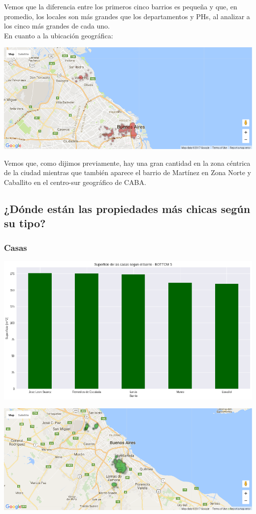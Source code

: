 \documentclass[a4paper, 10pt]{article}
\newcommand\tab[1][0.5cm]{\hspace*{#1}}
\begin{document}
				  	\tab Vemos que la diferencia entre los primeros cinco barrios es pequeña y que, en promedio, los locales son
				  	más grandes que los departamentos y PHs, al analizar a los cinco más grandes de cada uno. \\
				  	\tab En cuanto a la ubicación geográfica:
				  	\begin{center}
   		    				\includegraphics[width=\textwidth]{images/storeSurfaceTopMap}
				  	\end{center}
				  	\tab Vemos que, como dijimos previamente, hay una gran cantidad en la zona céntrica de la ciudad mientras que
				  	también aparece el barrio de Martínez en Zona Norte y Caballito en el centro-sur geográfico de CABA.
			\subsection{¿Dónde están las propiedades más chicas según su tipo?}
				\subsubsection{Casas}
					\begin{center}
   		    				\includegraphics[width=\textwidth]{images/houseSurfaceBottomBar}
				  	\end{center}
				  	\begin{center}
   		    				\includegraphics[width=\textwidth]{images/houseSurfaceBottomMap}
				  	\end{center}
\end{document}

